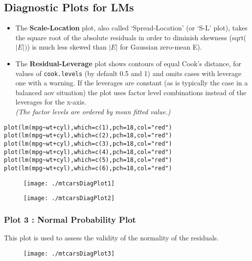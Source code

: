 \documentclass[12pt, a4paper]{article}
\theoremstyle{plain}
\theoremstyle{definition}
\theoremstyle{remark}
\begin{document}
\subsection{Diagnostic Plots for LMs}
\begin{itemize}
\item
The \textbf{Scale-Location} plot, also called ‘Spread-Location’ (or ‘S-L’ plot), takes the square root of the absolute residuals in order to diminish skewness (sqrt($|E|)$) is much less skewed than $| E |$ for Gaussian zero-mean E).

\item
The \textbf{Residual-Leverage} plot shows contours of equal Cook's distance, for values of \texttt{cook.levels} (by default 0.5 and 1) and omits cases with leverage one with a warning. If the leverages are constant (as is typically the case in a balanced aov situation) the plot uses factor level combinations instead of the leverages for the x-axis. \\
\textit{(The factor levels are ordered by mean fitted value.)}
\end{itemize}
\begin{framed}
\begin{verbatim}
plot(lm(mpg~wt+cyl),which=c(1),pch=18,col="red")
plot(lm(mpg~wt+cyl),which=c(2),pch=18,col="red")
plot(lm(mpg~wt+cyl),which=c(3),pch=18,col="red")
plot(lm(mpg~wt+cyl),which=c(4),pch=18,col="red")
plot(lm(mpg~wt+cyl),which=c(5),pch=18,col="red")
plot(lm(mpg~wt+cyl),which=c(6),pch=18,col="red")
\end{verbatim}
\end{framed}

\begin{figure}[h!]
\centering
\texttt{[image: ./mtcarsDiagPlot1]}

\label{mtcarsDiagPlot1}
\end{figure}

\newpage
\begin{figure}[h!]
\centering
\texttt{[image: ./mtcarsDiagPlot2]}

\label{mtcarsDiagPlot2}
\end{figure}

\subsubsection{Plot 3 : Normal Probability Plot}
This plot is used to assess the validity of the normality of the residuals.
\begin{figure}[h!]
\centering
\texttt{[image: ./mtcarsDiagPlot3]}

\label{mtcarsDiagPlot3}
\end{figure}
\end{document}
